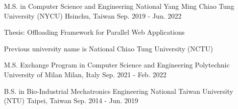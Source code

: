 

\begin{cventries}

  
\cventry
  {M.S. in Computer Science and Engineering} %
  {National Yang Ming Chiao Tung University (NYCU)} %
  {Hsinchu, Taiwan} %
  {Sep. 2019 - Jun. 2022} %
  {
    \begin{cvitems} %
      \item {Thesis: Offloading Framework for Parallel Web Applications}
      \item {Previous university name is National Chiao Tung University (NCTU)}
    \end{cvitems}
  }

\cventry
    {M.S. Exchange Program in Computer Science and Engineering} %
    {Polytechnic University of Milan} %
    {Milan, Italy} %
    {Sep. 2021 - Feb. 2022} %
    {
      \begin{cvitems} %
      \end{cvitems}
    }

  \cventry
    {B.S. in Bio-Industrial Mechatronics Engineering} %
    {National Taiwan University (NTU)} %
    {Taipei, Taiwan} %
    {Sep. 2014 - Jun. 2019} %
    {
      \begin{cvitems} %
      \end{cvitems}
    }

\end{cventries}
